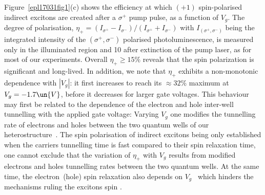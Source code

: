 \documentclass[doublecol,final]{epl2}
\begin{document}
Figure~\ref{epl17031fig1}(c) shows the efficiency at which $(+1)$ spin-polarised indirect excitons are created after a $\sigma^+$  pump pulse, as a function of $V_{g}$. The degree of polarisation, $\eta_{+}= (I_{\sigma^+}-I_{\sigma^-})/(I_{\sigma^+}+I_{\sigma^-})$ with $I_{(\sigma^+,\sigma^-)}$ being the integrated intensity of the $(\sigma^+,\sigma^-)$ polarised photoluminescence, is measured only in the illuminated region and 10 after extinction of the pump laser, as for most of our experiments. Overall $\eta_{+}\geq 15{\%}$ reveals that the spin polarization is significant and long-lived. In addition, we note that $\eta_{+}$ exhibits a non-monotonic dependence with $|V_g|$: it first increases to reach its $\approx 32{\%}$ maximum at $V_g = -1.7\un{V}$, before it decreases for larger gate voltages. This behaviour may first be related to the dependence of the electron and hole inter-well tunnelling with the applied gate voltage: Varying $V_g$ one modifies the tunnelling rate of electrons and holes between the two quantum wells of our heterostructure~\cite{epl17031bib16}. The spin polarisation of indirect excitons being only established when the carriers tunnelling time is fast compared to their spin relaxation time, one cannot exclude that the variation of $\eta_+$ with $V_g$ results from modified electrons and holes tunnelling rates between the two quantum wells. At the same time, the electron~(hole) spin relaxation also depends on $V_g$~\cite{epl17031bib1} which hinders the mechanisms ruling the excitons spin .
\end{document}
